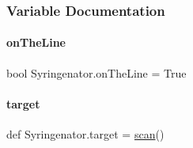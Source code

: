 \subsubsection{Variable Documentation}
\mbox{\label{namespaceSyringenator_a161fa877b77c9ebb120c1ed20739260b}} 
\paragraph{\texorpdfstring{onTheLine}{onTheLine}}
{\footnotesize\ttfamily bool Syringenator.\+on\+The\+Line = True}

\mbox{\label{namespaceSyringenator_a66c7999289f77a4adce05169661f9660}} 
\paragraph{\texorpdfstring{target}{target}}
{\footnotesize\ttfamily def Syringenator.\+target = \mbox{\hyperlink{namespaceSyringenator_aff01237d3ff3e33f0ffc32927d813df0}{scan}}()}

